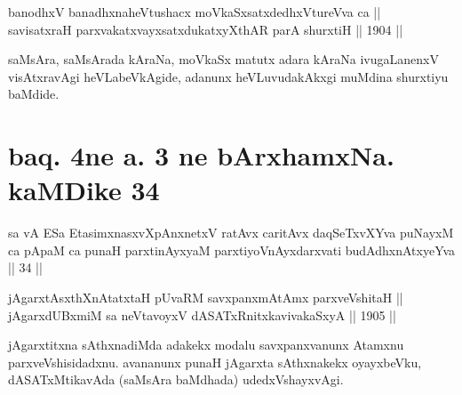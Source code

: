 
\begin{shl}
banodhxV banadhxnaheVtushacx moVkaSxsatxdedhxVtureVva ca || \\
savisatxraH parxvakatxvayxsatxdukatxyXthAR parA shurxtiH ||  1904 ||  
\end{shl}

\begin{artha}
saMsAra, saMsArada kAraNa, moVkaSx matutx adara kAraNa ivugaLanenxV
visAtxravAgi heVLabeVkAgide, adanunx heVLuvudakAkxgi muMdina shurxtiyu
baMdide.
\end{artha}

\section*{baq. 4ne a. 3 ne bArxhamxNa. kaMDike 34}

\begin{shl}
sa vA ESa EtasimxnasxvXpAnxnetxV ratAvx caritAvx daqSeTxvXYva puNayxM ca pApaM ca punaH parxtinAyxyaM parxtiyoVnAyxdarxvati budAdhxnAtxyeYva || 34 ||
\end{shl}


\begin{shl}
\footnotemark[1]jAgarxtAsxthXnAtatxtaH pUvaRM savxpanxmAtAmx parxveVshitaH || \\
jAgarxdUBxmiM sa neVtavoyxV dASATxRnitxkavivakaSxyA ||  1905 ||  
\end{shl}

\begin{artha}
jAgarxtitxna sAthxnadiMda adakekx modalu savxpanxvanunx
Atamxnu parxveVshisidadxnu. avananunx punaH jAgarxta sAthxnakekx
oyayxbeVku, dASATxMtikavAda (saMsAra baMdhada) udedxVshayxvAgi.
\end{artha}


